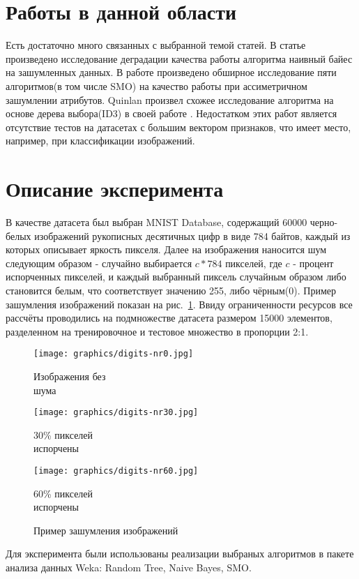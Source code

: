 \documentclass{article}
\begin{document}
 
\section{Работы в данной области}
Есть достаточно много связанных с выбранной темой статей. В статье \cite{glick2004enrichment} произведено исследование деградации качества работы алгоритма наивный байес на зашумленных данных. В работе \cite{Mannino2009743} произведено обширное исследование пяти алгоритмов(в том числе SMO) на качество работы при ассиметричном зашумлении атрибутов. Quinlan произвел схожее исследование алгоритма на основе дерева выбора(ID3) в своей работе \cite{QuinlanTrees}. Недостатком этих работ является отсутствие тестов на датасетах с большим вектором признаков, что имеет место, например, при классификации изображений.

\section{Описание эксперимента}
В качестве датасета был выбран MNIST Database\cite{quanpt:mnistlecun}, содержащий 60000 черно-белых изображений рукописных десятичных цифр в виде 784 байтов, каждый из которых описывает яркость пикселя. Далее на изображения наносится шум следующим образом - случайно выбирается $c * 784$ пикселей, где $c$ - процент испорченных пикселей, и каждый выбранный пиксель случайным образом либо становится белым, что соответствует значению 255, либо чёрным(0). Пример зашумления изображений показан на рис.~\ref{fig:noise}. Ввиду ограниченности ресурсов все рассчёты проводились на подмножестве датасета размером 15000 элементов, разделенном на тренировочное и тестовое множество в пропорции 2:1.

\begin{figure}[ht!b]
\centering
\begin{minipage}{.3\textwidth}
	\texttt{[image: graphics/digits-nr0.jpg]}
	\captionsetup{justification=centering}
	\caption*{Изображения без\\ шума}
\end{minipage}
\begin{minipage}{.3\textwidth}
	\texttt{[image: graphics/digits-nr30.jpg]}
	\captionsetup{justification=centering}
	\caption*{ 30\% пикселей\\ испорчены}
\end{minipage}
\begin{minipage}{.3\textwidth}
	\texttt{[image: graphics/digits-nr60.jpg]}
	\captionsetup{justification=centering}
	\caption*{ 60\% пикселей\\ испорчены}
\end{minipage}
\caption{Пример зашумления изображений}
\label{fig:noise}
\end{figure}
Для эксперимента были использованы реализации выбраных алгоритмов в пакете анализа данных Weka: Random Tree, Naive Bayes, SMO.
\end{document}
